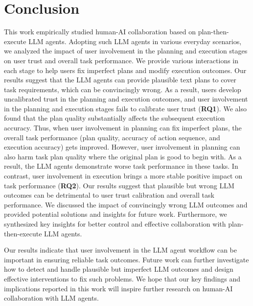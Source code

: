 \section{Conclusion}
This work empirically studied human-AI collaboration based on plan-then-execute LLM agents. 
Adopting such LLM agents in various everyday scenarios, %
we analyzed the impact of user involvement in the planning and execution stages on user trust and overall task performance. 
We provide various interactions in each stage to help users fix imperfect plans and modify execution outcomes. 
Our results suggest that the LLM agents can provide plausible text plans to cover task requirements, which can be convincingly wrong. 
As a result, users develop uncalibrated trust in the planning and execution outcomes, and user involvement in the planning and execution stages fails to calibrate user trust (\textbf{RQ1}). 
We also found that the plan quality substantially affects the subsequent execution accuracy. 
Thus, when user involvement in planning can fix imperfect plans, the overall task performance (\ie plan quality, accuracy of action sequence, and execution accuracy) gets improved. 
However, user involvement in planning can also harm task plan quality where the original plan is good to begin with. As a result, the LLM agents demonstrate worse task performance in these tasks. 
In contrast, %
user involvement in execution brings a more stable positive impact on task performance (\textbf{RQ2}). 
Our results suggest that plausible but wrong LLM outcomes can be detrimental to user trust calibration and overall task performance. 
We discussed the impact of convincingly wrong LLM outcomes and provided potential solutions and insights for future work. 
Furthermore, we synthesized key insights for better control and effective collaboration with plan-then-execute LLM agents.  %

Our results indicate that user involvement in the LLM agent workflow can be important in ensuring reliable task outcomes. 
Future work can further investigate how to detect and handle plausible but imperfect LLM outcomes and design effective interventions to fix such problems. 
We hope that our key findings and implications reported in this work will inspire further research on human-AI collaboration with LLM agents.